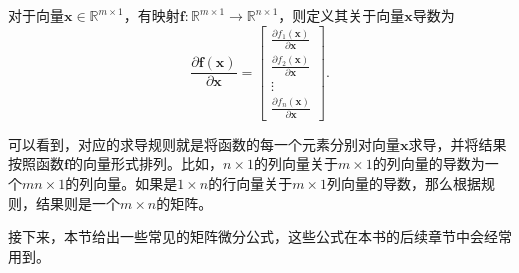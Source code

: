 \begin{definition}[向量关于向量求导]
    对于向量\( \bm{x} \in \mathbb{R}^{m \times 1} \)，有映射\( \bm{f}: \mathbb{R}^{m \times 1} \rightarrow \mathbb{R}^{n \times 1} \)，则定义其关于向量\( \bm{x} \)导数为
    \[
        \frac{\partial \bm{f}(\bm{x})}{\partial \bm{x}} =
        \begin{bmatrix}
            \frac{\partial f_1(\bm{x})}{\partial \bm{x}} \\
            \frac{\partial f_2(\bm{x})}{\partial \bm{x}} \\
            \vdots                                       \\
            \frac{\partial f_n(\bm{x})}{\partial \bm{x}}
        \end{bmatrix}.
    \]
\end{definition}
可以看到，对应的求导规则就是将函数的每一个元素分别对向量\( \bm{x} \)求导，并将结果按照函数\( \bm{f} \)的向量形式排列。比如，\( n \times 1 \)的列向量关于\( m \times 1 \)的列向量的导数为一个\( mn \times 1 \)的列向量。如果是\( 1 \times n \)的行向量关于\( m \times 1 \)列向量的导数，那么根据规则，结果则是一个\( m \times n \)的矩阵。

接下来，本节给出一些常见的矩阵微分公式，这些公式在本书的后续章节中会经常用到。

